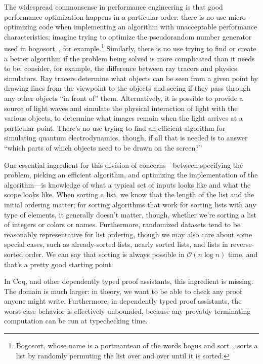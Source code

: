 The widespread commonsense in performance engineering %
is that good performance optimization happens in a particular order:
there is no use micro-optimizing code when implementing an algorithm with unacceptable performance characteristics; imagine trying to optimize the pseudorandom number generator used in bogosort~\cite{Sorting2007Gruber}, for example.\footnote{Bogosort, whose name is a portmanteau of the words bogus and sort~\cite{bogosort-name}, sorts a list by randomly permuting the list over and over until it is sorted.}
Similarly, there is no use trying to find or create a better algorithm if the problem being solved is more complicated than it needs to be; consider, for example, the difference between ray tracers and physics simulators.
Ray tracers determine what objects can be seen from a given point by drawing lines from the viewpoint to the objects and seeing if they pass through any other objects ``in front of'' them.
Alternatively, it is possible to provide a source of light waves and simulate the physical interaction of light with the various objects, to determine what images remain when the light arrives at a particular point.
There's no use trying to find an efficient algorithm for simulating quantum electrodynamics, though, if all that is needed is to answer ``which parts of which objects need to be drawn on the screen?''

One essential ingredient for this division of concerns---between specifying the problem, picking an efficient algorithm, and optimizing the implementation of the algorithm---is knowledge of what a typical set of inputs looks like and what the scope looks like.
When sorting a list, we know that the length of the list and the initial ordering matter; for sorting algorithms that work for sorting lists with any type of elements, it generally doesn't matter, though, whether we're sorting a list of integers or colors or names.
Furthermore, randomized datasets tend to be reasonably representative for list ordering, though we may also care about some special cases, such as already-sorted lists, nearly sorted lists, and lists in reverse-sorted order.
We can say that sorting is always possible in $\mathcal O(n\log n)$ time, and that's a pretty good starting point.

In Coq, and other dependently typed proof assistants, this ingredient is missing.
The domain is much larger: in theory, we want to be able to check any proof anyone might write.
Furthermore, in dependently typed proof assistants, the worst-case behavior is effectively unbounded, because any provably terminating computation can be run at typechecking time.
%


